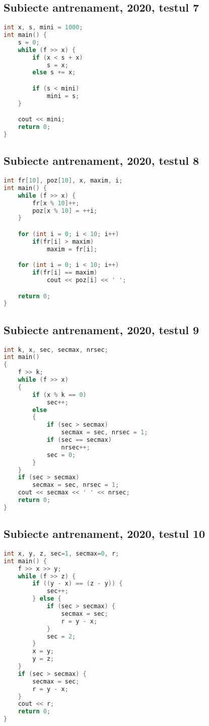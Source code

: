 \documentclass[10pt, a4paper, twocolumn]{article}
\begin{document}
\subsection*{Subiecte antrenament, 2020, testul 7}
\begin{lstlisting}[language=C++]
int x, s, mini = 1000;
int main() {
    s = 0;
    while (f >> x) {
        if (x < s + x)
            s = x;
        else s += x;

        if (s < mini)
            mini = s;
    }

    cout << mini;
    return 0;
}
\end{lstlisting}
\vspace{0.5cm}

\subsection*{Subiecte antrenament, 2020, testul 8}
\begin{lstlisting}[language=C++]
int fr[10], poz[10], x, maxim, i;
int main() {
    while (f >> x) {
        fr[x % 10]++;
        poz[x % 10] = ++i;
    }

    for (int i = 0; i < 10; i++)
        if(fr[i] > maxim)
            maxim = fr[i];    

    for (int i = 0; i < 10; i++)
        if(fr[i] == maxim)
            cout << poz[i] << ' ';

    return 0;
}
\end{lstlisting}
\vspace{0.5cm}

\subsection*{Subiecte antrenament, 2020, testul 9}
\begin{lstlisting}[language=C++]
int k, x, sec, secmax, nrsec;
int main()
{
    f >> k;
    while (f >> x)
    {
        if (x % k == 0)
            sec++;
        else
        {
            if (sec > secmax)
                secmax = sec, nrsec = 1;
            if (sec == secmax)
                nrsec++;
            sec = 0;
        }
    }
    if (sec > secmax)
        secmax = sec, nrsec = 1;
    cout << secmax << ' ' << nrsec;
    return 0;
}
\end{lstlisting}

\vspace{0.5cm}

\subsection*{Subiecte antrenament, 2020, testul 10}
\begin{lstlisting}[language=C++]
int x, y, z, sec=1, secmax=0, r;
int main() {
    f >> x >> y;
    while (f >> z) {
        if ((y - x) == (z - y)) {
            sec++;
        } else {
            if (sec > secmax) {
                secmax = sec;
                r = y - x;
            }
            sec = 2;
        }
        x = y;
        y = z;
    }
    if (sec > secmax) {
        secmax = sec;
        r = y - x;
    }
    cout << r;
    return 0;
}
\end{lstlisting}
\vspace{0.5cm}
\end{document}
